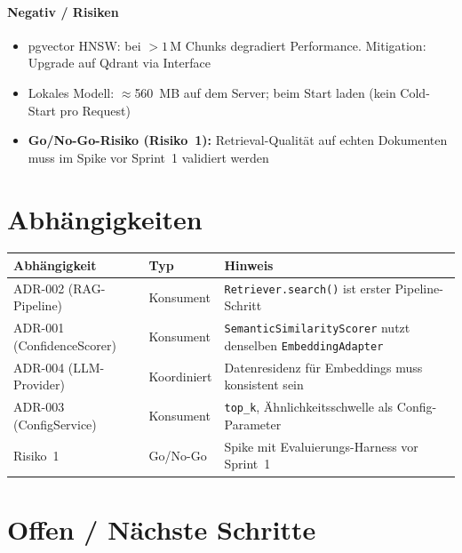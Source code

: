 \documentclass[a4paper, 11pt, oneside]{report}
\newcommand{\code}[1]{\texttt{\small #1}}
\begin{document}
\paragraph{Negativ / Risiken}
\begin{itemize}
  \item pgvector HNSW: bei $> 1\,\text{M}$ Chunks degradiert Performance.
        Mitigation: Upgrade auf Qdrant via Interface
  \item Lokales Modell: $\approx$560~MB auf dem Server; beim Start laden
        (kein Cold-Start pro Request)
  \item \textbf{Go/No-Go-Risiko (Risiko~1):} Retrieval-Qualität auf echten
        Dokumenten muss im Spike vor Sprint~1 validiert werden
\end{itemize}

\section{Abhängigkeiten}

\begin{table}[htb]
\small\centering
\begin{tabularx}{\linewidth}{L{4cm} L{3cm} X}
\toprule
{}
\textbf{Abhängigkeit} & \textbf{Typ} & \textbf{Hinweis} \\
\midrule
ADR-002 (RAG-Pipeline)    & Konsument     & \code{Retriever.search()} ist erster Pipeline-Schritt \\
ADR-001 (ConfidenceScorer)& Konsument     & \code{SemanticSimilarityScorer} nutzt denselben \code{EmbeddingAdapter} \\
ADR-004 (LLM-Provider)    & Koordiniert   & Datenresidenz für Embeddings muss konsistent sein \\
ADR-003 (ConfigService)   & Konsument     & \code{top\_k}, Ähnlichkeitsschwelle als Config-Parameter \\
Risiko~1                  & Go/No-Go      & Spike mit Evaluierungs-Harness vor Sprint~1 \\
\bottomrule
\end{tabularx}
\end{table}

\section{Offen / Nächste Schritte}
\end{document}
